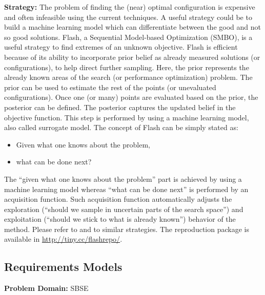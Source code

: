 \documentclass[sigconf]{acmart}
\begin{document}
\noindent\textbf{Strategy: } The problem of finding the (near) optimal configuration is expensive and often infeasible using the current techniques. A useful strategy could be to build a machine learning model which can differentiate between the good and not so good solutions. Flash, a Sequential Model-based Optimization (SMBO), is a useful
strategy to find extremes of an unknown objective. Flash is
efficient because of its ability to incorporate prior belief as
already measured solutions (or configurations), to help direct
further sampling. Here, the prior represents the already
known areas of the search (or performance optimization) problem. The prior can be used to estimate the rest of the
points (or unevaluated configurations). Once one (or many) points are evaluated based on the prior,
the posterior can be defined. The posterior captures the updated belief in
the objective function. This step is performed by using a
machine learning model, also called surrogate model. 
The concept of Flash can be simply stated as:
\begin{itemize}[leftmargin=*]
\item Given what one knows about the problem,
\item what can be done next?
\end{itemize}
The ``given what one knows about the problem'' part is
achieved by using a machine learning model whereas ``what can be done next'' is performed by an acquisition function.
Such acquisition function automatically adjusts the exploration
(``should we sample in uncertain parts of the search
space'') and exploitation (``should we stick to what is already
known'') behavior of the method. Please refer to  \cite{nair2018finding} and  \cite{nair2017using,nair2017faster, jamshidi2016uncertainty} to similar strategies. The reproduction package is available in \url{http://tiny.cc/flashrepo/}.

    \subsection{Requirements Models}
    \textbf{Problem Domain: } SBSE
    
\end{document}
